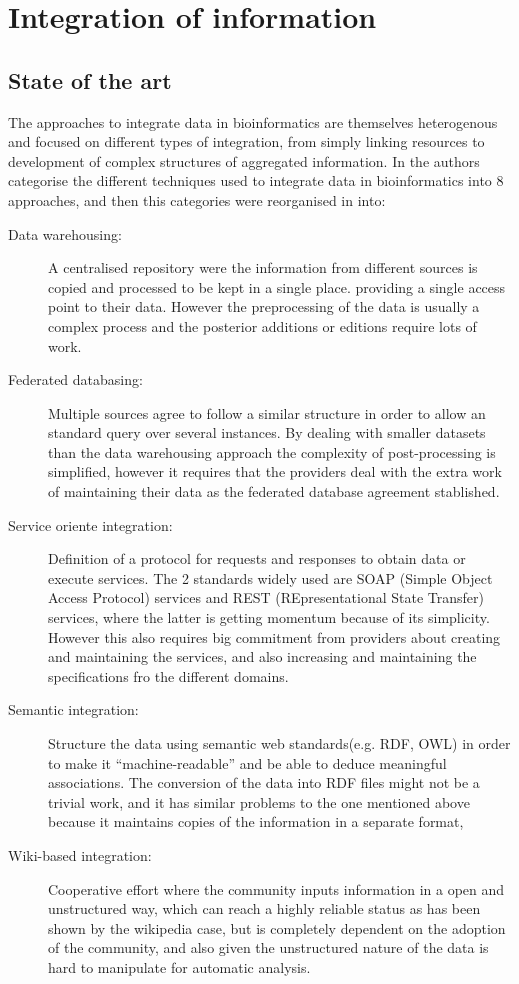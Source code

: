 \section{Integration of information}
\subsection{State of the art}
The approaches to integrate data in bioinformatics are themselves heterogenous and focused on different types of integration, from simply linking resources to development of complex structures of aggregated information. In \cite{GOB2008} the authors categorise the different techniques used to integrate data in bioinformatics into 8 approaches, and then this categories were reorganised in \cite{ZHA2011b} into:
\begin{description}
\item[Data warehousing:] 			A centralised repository were the information from different sources is copied and processed to be kept  in a single place. providing a single access point to their data. However the preprocessing of the data is usually a complex process and the posterior additions or editions require lots of work.
\item[Federated databasing:] 		Multiple sources agree to follow a similar structure in order to allow an standard query over several instances. By dealing with smaller datasets than the data warehousing approach the complexity of post-processing is simplified, however it requires that the providers deal with the extra work of maintaining their data as the federated database agreement stablished.
\item[Service oriente integration:] 	Definition of a protocol for requests and responses to obtain data or execute services. The 2 standards widely used are SOAP (Simple Object Access Protocol) services and REST (REpresentational State Transfer) services, where the latter is getting momentum because of its simplicity. However this also requires big commitment from providers about creating and maintaining the services, and also increasing and maintaining the specifications fro the different domains.
\item[Semantic integration:] 		Structure the data using semantic web standards(e.g. RDF, OWL) in order to make it ``machine-readable'' and be able to deduce meaningful associations. The conversion of the data into RDF files might not be a trivial work, and it has similar problems to the one mentioned above because it maintains copies of the information in a separate format, 
\item[Wiki-based integration:] 		Cooperative effort where the community inputs information in a open and unstructured way, which can reach a highly reliable status as has been shown by the wikipedia case, but is completely dependent on the adoption of the community, and also given the unstructured nature of the data is hard to manipulate for automatic analysis.
\end{description}

